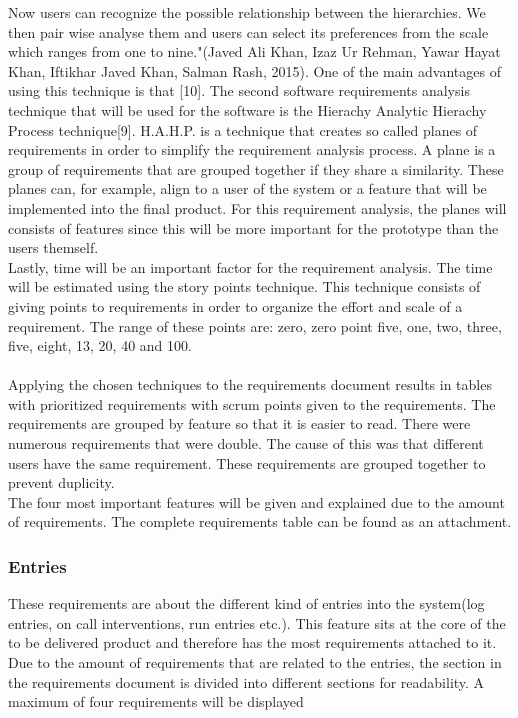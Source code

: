\documentclass[paper=a4, fontsize=11pt,twoside]{scrartcl}	%
\begin{document}
Now users can recognize the possible relationship between 
the hierarchies. We then pair wise analyse them and users can select its preferences from the scale which ranges from 
one to nine."(Javed Ali Khan, Izaz Ur Rehman, Yawar Hayat Khan, Iftikhar Javed Khan, Salman Rash, 2015). One of the main advantages of using this technique is that [10]. The second software requirements analysis technique that will be used for the software is the Hierachy Analytic Hierachy Process technique[9]. H.A.H.P. is a technique that creates so called planes of requirements in order to simplify the requirement analysis process. A plane is a group of requirements that are grouped together if they share a similarity. These planes can, for example, align to a user of the system or a feature that will be implemented into the final product. For this requirement analysis, the planes will consists of features since this will be more important for the prototype than the users themself. \\
Lastly, time will be an important factor for the requirement analysis. The time will be estimated using the story points technique. This technique consists of giving  points to requirements in order to organize the effort and scale of a requirement. The range of these points are:  zero, zero point five, one, two, three, five, eight, 13, 20, 40 and 100. \\ \\
Applying the chosen techniques to the requirements document results in tables with prioritized requirements with scrum points given to the requirements. The requirements are grouped by feature so that it is easier to read. There were numerous requirements that were double. The cause of this was that different users have the same requirement. These requirements are grouped together to prevent duplicity. \\
The four most important features will be given and explained due to the amount of requirements. The complete requirements table can be found as an attachment.\\

\subsubsection{Entries}
These requirements are about the different kind of entries into the system(log entries, on call interventions, run entries etc.). This feature sits at the core of the to be delivered product and therefore has the most requirements attached to it. Due to the amount of requirements that are related to the entries, the section in the requirements document is divided into different sections for readability. A maximum of four requirements will be displayed
\end{document}
